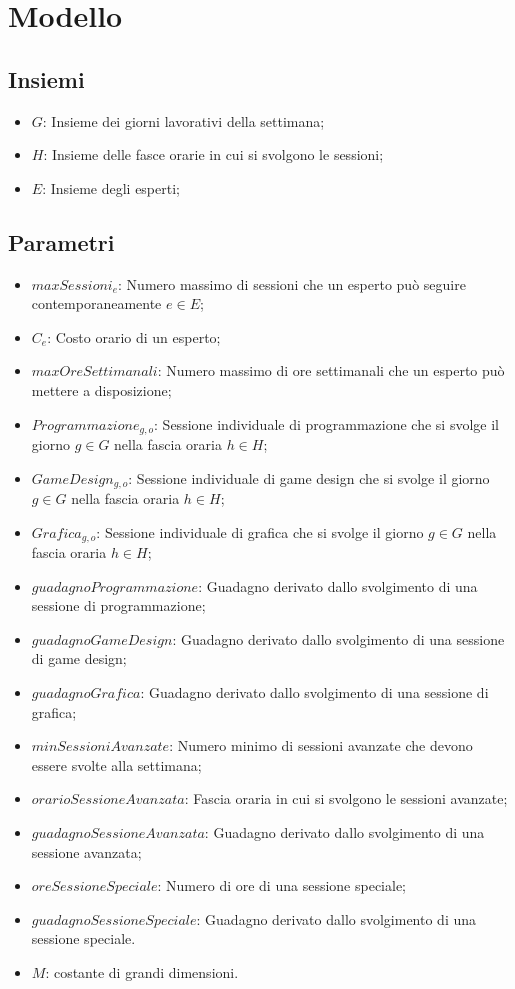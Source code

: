 \documentclass[12pt]{article}
\begin{document}
    \section{Modello}
    \subsection{Insiemi}
    \begin{itemize}
        \item $G$: Insieme dei giorni lavorativi della settimana;
        \item $H$: Insieme delle fasce orarie in cui si svolgono le sessioni;
        \item $E$: Insieme degli esperti;
    \end{itemize}
    \subsection{Parametri}
    \begin{itemize}
        \item $maxSessioni_e$: Numero massimo di sessioni che un esperto può seguire contemporaneamente $e \in E$;
        \item $C_e$: Costo orario di un esperto;
        \item $maxOreSettimanali$: Numero massimo di ore settimanali che un esperto può mettere a disposizione;
        \item $Programmazione_{g,o}$: Sessione individuale di programmazione che si svolge il giorno $g \in G$ nella fascia oraria $h \in H$;
        \item $GameDesign_{g,o}$: Sessione individuale di game design che si svolge il giorno $g \in G$ nella fascia oraria $h \in H$;
        \item $Grafica_{g,o}$: Sessione individuale di grafica che si svolge il giorno $g \in G$ nella fascia oraria $h \in H$;
        \item $guadagnoProgrammazione$: Guadagno derivato dallo svolgimento di una sessione di programmazione;
        \item $guadagnoGameDesign$: Guadagno derivato dallo svolgimento di una sessione di game design;
        \item $guadagnoGrafica$: Guadagno derivato dallo svolgimento di una sessione di grafica;
        \item $minSessioniAvanzate$: Numero minimo di sessioni avanzate che devono essere svolte alla settimana;
        \item $orarioSessioneAvanzata$: Fascia oraria in cui si svolgono le sessioni avanzate;
        \item $guadagnoSessioneAvanzata$: Guadagno derivato dallo svolgimento di una sessione avanzata;
        \item $oreSessioneSpeciale$: Numero di ore di una sessione speciale;
        \item $guadagnoSessioneSpeciale$: Guadagno derivato dallo svolgimento di una sessione speciale.
        \item $M$: costante di grandi dimensioni.
    \end{itemize}
\end{document}
